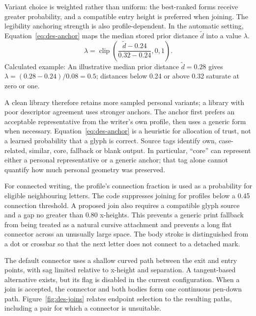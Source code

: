 Variant choice is weighted rather than uniform: the best-ranked forms receive greater probability, and a compatible entry height is preferred when joining. The legibility anchoring strength is also profile-dependent. In the automatic setting, Equation~\ref{eq:des-anchor} maps the median stored prior distance $\widetilde d$ into a value $\lambda$.
\begin{equation}
\lambda=\operatorname{clip}\left(\frac{\widetilde d-0.24}{0.32-0.24},0,1\right).
\label{eq:des-anchor}
\end{equation}
Calculated example: An illustrative median prior distance $\widetilde d=0.28$ gives $\lambda=(0.28-0.24)/0.08=0.5$; distances below 0.24 or above 0.32 saturate at zero or one. \cite[synthesise.py, AutoLegibility]{braunepipeline2026}

A clean library therefore retains more sampled personal variants; a library with poor descriptor agreement uses stronger anchors. The anchor first prefers an acceptable representative from the writer's own profile, then uses a generic form when necessary. Equation~\ref{eq:des-anchor} is a heuristic for allocation of trust, not a learned probability that a glyph is correct. Source tags identify own, case-related, similar, core, fallback or blank output. In particular, ``core'' can represent either a personal representative or a generic anchor; that tag alone cannot quantify how much personal geometry was preserved.~\cite[style.py; synthesise.py; reproduce.py]{braunepipeline2026}

For connected writing, the profile's connection fraction is used as a probability for eligible neighbouring letters. The code suppresses joining for profiles below a 0.45 connection threshold. A proposed join also requires a compatible glyph source and a gap no greater than 0.80 x-heights. This prevents a generic print fallback from being treated as a natural cursive attachment and prevents a long flat connector across an unusually large space. The body stroke is distinguished from a dot or crossbar so that the next letter does not connect to a detached mark.~\cite[style.py; synthesise.py; reproduce.py]{braunepipeline2026}

The default connector uses a shallow curved path between the exit and entry points, with sag limited relative to x-height and separation. A tangent-based alternative exists, but its flag is disabled in the current configuration. When a join is accepted, the connector and both bodies form one continuous pen-down path. Figure~\ref{fig:des-joins} relates endpoint selection to the resulting paths, including a pair for which a connector is unsuitable.~\cite[style.py; synthesise.py]{braunepipeline2026}


